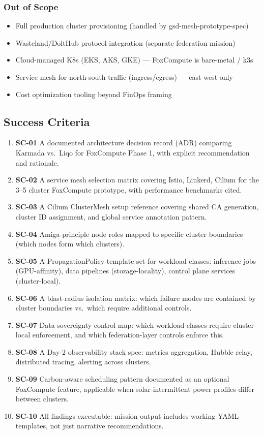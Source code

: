 \documentclass[11pt,letterpaper]{article}
\begin{document}
\subsubsection{Out of Scope}
\begin{itemize}[leftmargin=1.5em]
  \item Full production cluster provisioning (handled by gsd-mesh-prototype-spec)
  \item Wasteland/DoltHub protocol integration (separate federation mission)
  \item Cloud-managed K8s (EKS, AKS, GKE) --- FoxCompute is bare-metal / k3s
  \item Service mesh for north-south traffic (ingress/egress) --- east-west only
  \item Cost optimization tooling beyond FinOps framing
\end{itemize}

\subsection{Success Criteria}

\begin{enumerate}
  \item \textbf{SC-01} A documented architecture decision record (ADR) comparing Karmada vs.\ Liqo for FoxCompute Phase 1, with explicit recommendation and rationale.
  \item \textbf{SC-02} A service mesh selection matrix covering Istio, Linkerd, Cilium for the 3--5 cluster FoxCompute prototype, with performance benchmarks cited.
  \item \textbf{SC-03} A Cilium ClusterMesh setup reference covering shared CA generation, cluster ID assignment, and global service annotation pattern.
  \item \textbf{SC-04} Amiga-principle node roles mapped to specific cluster boundaries (which nodes form which clusters).
  \item \textbf{SC-05} A PropagationPolicy template set for workload classes: inference jobs (GPU-affinity), data pipelines (storage-locality), control plane services (cluster-local).
  \item \textbf{SC-06} A blast-radius isolation matrix: which failure modes are contained by cluster boundaries vs.\ which require additional controls.
  \item \textbf{SC-07} Data sovereignty control map: which workload classes require cluster-local enforcement, and which federation-layer controls enforce this.
  \item \textbf{SC-08} A Day-2 observability stack spec: metrics aggregation, Hubble relay, distributed tracing, alerting across clusters.
  \item \textbf{SC-09} Carbon-aware scheduling pattern documented as an optional FoxCompute feature, applicable when solar-intermittent power profiles differ between clusters.
  \item \textbf{SC-10} All findings executable: mission output includes working YAML templates, not just narrative recommendations.
\end{enumerate}
\end{document}
